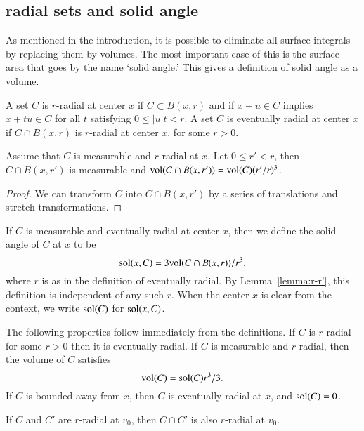 \subsection{radial sets and solid angle}\label{sec:solid}

As mentioned in the introduction, it is possible to eliminate all
surface integrals by replacing them by volumes.  The most
important case of this is the surface area that goes by the name
`solid angle.'  This gives a definition of solid angle as a
volume.


\begin{definition}
    A set $C$ is $r$-radial at center $x$ if  $C\subset B(x,r)$
    and if
        $x + u \in C$ implies
        $x + t u \in C$ for all $t$ satisfying $0\le |u| t < r$.
A set $C$ is eventually radial at center $x$ if $C\cap B(x,r)$ is
$r$-radial at center $x$, for some $r>0$.
\end{definition}

\begin{lemma}
Assume that $C$ is measurable and $r$-radial at $x$.  Let $0\le r'<r$,
then $C\cap B(x,r')$ is measurable and
${\operatorname{vol}}(C\cap B(x,r')) = {\operatorname{vol}}(C) (r'/r)^3$.
\end{lemma}

\begin{proof}  We can transform $C$ into $C\cap B(x,r')$ by
a series of translations and stretch transformations.
\end{proof}


\begin{definition}
If $C$ is measurable and eventually radial at center $x$, then we
define the solid angle of $C$ at $x$ to be
    $$
    {\operatorname{sol}}(x,C) = 3 {\operatorname{vol}}(C\cap B(x,r))/r^3,
    $$
where $r$ is as in the definition of eventually radial. 
By Lemma~\ref{lemma:r-r'}, this
definition is independent of any such $r$.  When the center $x$ is
clear from the context, we write ${\operatorname{sol}}(C)$ for
${\operatorname{sol}}(x,C)$.
\end{definition}



The following properties follow immediately from the definitions.
If $C$ is $r$-radial for some $r>0$ then it is eventually radial.
If $C$ is measurable and $r$-radial, then the volume of $C$
satisfies
    $$
    {\operatorname{vol}}(C) = {\operatorname{sol}}(C) r^3/3.
    $$
If $C$ is bounded away from $x$, then $C$ is eventually radial at
$x$, and ${\operatorname{sol}}(C) = 0$.

\begin{lemma}  If $C$ and $C'$ are  $r$-radial
at $v_0$, then $C\cap C'$ is also $r$-radial at
$v_0$.
\end{lemma}






